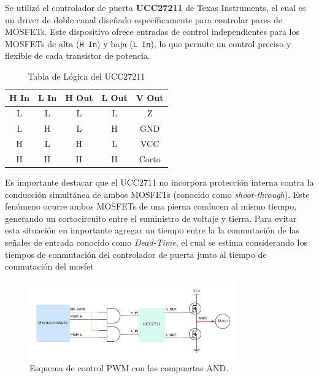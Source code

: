 \documentclass[11pt]{report}
\begin{document}
Se utilizó el controlador de puerta \textbf{UCC27211} de Texas Instruments, el cual es un driver de doble canal diseñado específicamente para controlar pares de MOSFETs. Este dispositivo ofrece entradas de control independientes para los MOSFETs de alta (\texttt{H In}) y baja (\texttt{L In}), lo que permite un control preciso y flexible de cada transistor de potencia.

\begin{table}[ht]
	\centering
	\caption{Tabla de Lógica del UCC27211}
	\label{tab:device_logic}
	\begin{tabular}{|c|c|c|c|c|}
		\hline
		\textbf{H In} & \textbf{L In} & \textbf{H Out} & \textbf{L Out} & \textbf{V Out} \\ \hline
		L             & L             & L              & L              & Z              \\ \hline
		L             & H             & L              & H              & GND            \\ \hline
		H             & L             & H              & L              & VCC            \\ \hline
		H             & H             & H              & H              & Corto          \\ \hline
	\end{tabular}
\end{table}
\FloatBarrier

\newpage
Es importante destacar que el UCC2711 no incorpora protección interna contra la conducción simultánea de ambos MOSFETs (conocido como \textit{shoot-through}). Este fenómeno ocurre ambos MOSFETs de una pierna conducen al mismo tiempo, generando un cortocircuito entre el suministro de voltaje y tierra. Para evitar esta situación en importante agregar un tiempo entre la la conmutación de las señales de entrada conocido como \textit{Dead-Time}, el cual se estima considerando los tiempos de conmutación del controlador de puerta junto al tiempo de conmutación del mosfet

\begin{figure}[ht]
	\centering
	\includegraphics[width=0.8\textwidth]{imagenes/Diagramas/Diagramas - AND.png}
	\caption{Esquema de control PWM con las compuertas AND.}
	\label{fig:control-pwm-and}
\end{figure}
\FloatBarrier
\end{document}
